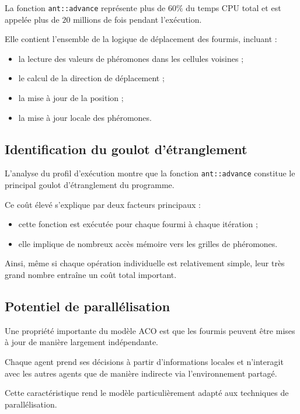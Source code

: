 \documentclass[11pt]{article}
\begin{document}
La fonction \texttt{ant::advance} représente plus de $60\%$ du temps CPU total et est appelée plus de $20$ millions de fois pendant l'exécution.

Elle contient l'ensemble de la logique de déplacement des fourmis, incluant :

\begin{itemize}
\item la lecture des valeurs de phéromones dans les cellules voisines ;
\item le calcul de la direction de déplacement ;
\item la mise à jour de la position ;
\item la mise à jour locale des phéromones.
\end{itemize}

\subsection{Identification du goulot d'étranglement}

L'analyse du profil d'exécution montre que la fonction \texttt{ant::advance} constitue le principal goulot d'étranglement du programme.

Ce coût élevé s'explique par deux facteurs principaux :

\begin{itemize}

\item cette fonction est exécutée pour chaque fourmi à chaque itération ;
\item elle implique de nombreux accès mémoire vers les grilles de phéromones.

\end{itemize}

Ainsi, même si chaque opération individuelle est relativement simple, leur très grand nombre entraîne un coût total important.

\subsection{Potentiel de parallélisation}

Une propriété importante du modèle ACO est que les fourmis peuvent être mises à jour de manière largement indépendante.

Chaque agent prend ses décisions à partir d'informations locales et n'interagit avec les autres agents que de manière indirecte via l'environnement partagé.

Cette caractéristique rend le modèle particulièrement adapté aux techniques de parallélisation.
\end{document}
